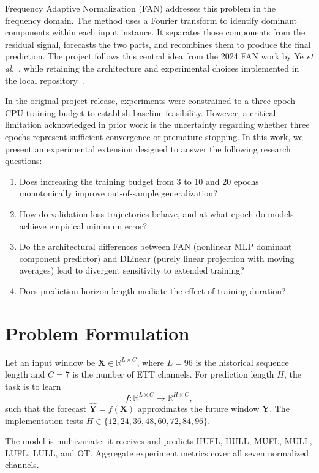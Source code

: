 \documentclass[conference,10pt]{IEEEtran}
\begin{document}
Frequency Adaptive Normalization (FAN) addresses this problem in the frequency domain. The method uses a Fourier transform to identify dominant components within each input instance. It separates those components from the residual signal, forecasts the two parts, and recombines them to produce the final prediction. The project follows this central idea from the 2024 FAN work by Ye \emph{et al.}~\cite{fanpaper}, while retaining the architecture and experimental choices implemented in the local repository~\cite{fancode}.

In the original project release, experiments were constrained to a three-epoch CPU training budget to establish baseline feasibility. However, a critical limitation acknowledged in prior work is the uncertainty regarding whether three epochs represent sufficient convergence or premature stopping. In this work, we present an experimental extension designed to answer the following research questions:
\begin{enumerate}
    \item Does increasing the training budget from 3 to 10 and 20 epochs monotonically improve out-of-sample generalization?
    \item How do validation loss trajectories behave, and at what epoch do models achieve empirical minimum error?
    \item Do the architectural differences between FAN (nonlinear MLP dominant component predictor) and DLinear (purely linear projection with moving averages) lead to divergent sensitivity to extended training?
    \item Does prediction horizon length mediate the effect of training duration?
\end{enumerate}

\section{Problem Formulation}
Let an input window be $\mathbf{X}\in\mathbb{R}^{L\times C}$, where $L=96$ is the historical sequence length and $C=7$ is the number of ETT channels. For prediction length $H$, the task is to learn
\begin{equation}
f:\mathbb{R}^{L\times C}\rightarrow\mathbb{R}^{H\times C},
\end{equation}
such that the forecast $\widehat{\mathbf{Y}}=f(\mathbf{X})$ approximates the future window $\mathbf{Y}$. The implementation tests $H\in\{12,24,36,48,60,72,84,96\}$.

The model is multivariate: it receives and predicts HUFL, HULL, MUFL, MULL, LUFL, LULL, and OT. Aggregate experiment metrics cover all seven normalized channels.
\end{document}
